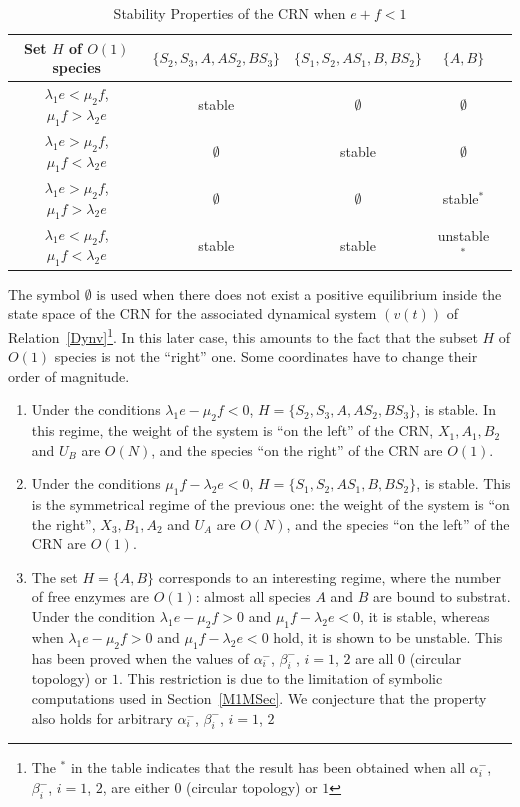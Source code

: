 \documentclass[english]{amsart}
\numberwithin{proposition}{section}
\begin{document}
 \begin{table}[h]
\begin{tabular}{|c|c|c|c|c|}
  \hline Set $H$ of $O(1)$ species   &$\{{ S}_2,{ S}_3, { A},  { AS}_2, { BS}_3\}$&$\{  { S}_1, { S}_2,  { AS}_1,{ B},  { BS}_2\}$&$\{   { A}, { B}\}$\\
  \hline $\lambda_1e<\mu_2f$, $\mu_1f>\lambda_2e$& stable & $\emptyset$ & $\emptyset$ \\
  \hline $\lambda_1e>\mu_2f$, $\mu_1f<\lambda_2e$&$\emptyset$&stable & $\emptyset$ \\
  \hline $\lambda_1e>\mu_2f$, $\mu_1f>\lambda_2e$& $\emptyset$ &$\emptyset$& stable${}^*$\\
  \hline $\lambda_1e<\mu_2f$, $\mu_1f<\lambda_2e$&stable&stable &unstable${}^*$ \\
  \hline
\end{tabular}
\vspace{4mm}

\caption{Stability Properties of the CRN when $e{+}f{<}1$}\label{Tab1}
 \end{table}

 The symbol $\emptyset$ is used when there does not exist a positive equilibrium inside the state space of the CRN for the  associated dynamical system $(v(t))$ of Relation~\eqref{Dynv}\footnote{The ${}^*$ in the table indicates that the result has been obtained when  all $\alpha_{i}^-$, $\beta_{i}^{-}$, $i{=}1$, $2$, are either $0$ (circular topology) or $1$}. In this later case, this amounts to the fact that the subset $H$ of $O(1)$ species is not the ``right'' one. Some coordinates have to change their order of magnitude. 

\begin{enumerate}
 \item Under the conditions $\lambda_1e{-}\mu_2f{<}0$, $H{=}\{{ S}_2,{ S}_3, { A},  { AS}_2, { BS}_3\}$, is stable.  In this regime, the weight of the system is ``on the left'' of the CRN, $X_1, A_1, B_2$ and $U_B$ are $O(N)$, and the species ``on the right'' of the CRN are $O(1)$.
  \item Under the conditions $\mu_1 f{-}\lambda_2e{<}0$, $H{=}\{  { S}_1, { S}_2,  { AS}_1,{ B},  { BS}_2\}$, is stable.  This is the symmetrical regime of the previous one: the weight of the system is ``on the right'', $X_3, B_1, A_2$ and $U_A$ are $O(N)$, and the species ``on the left'' of the CRN are $O(1)$.
	\item The set $H{=}\{ { A}, { B}\}$ corresponds to an interesting regime, where the number of free enzymes are $O(1)$: almost all species ${ A}$ and ${ B}$ are bound to substrat. Under the condition $\lambda_1e{-}\mu_2f{>}0$ and $\mu_1 f{-}\lambda_2e{<}0$, it is stable, whereas when $\lambda_1e{-}\mu_2f{>}0$ and $\mu_1 f{-}\lambda_2e{<}0$ hold, it is shown to be  unstable. This has been proved when the values of $\alpha_{i}^-$, $\beta_{i}^{-}$, $i{=}1$, $2$ are all  $0$ (circular topology) or $1$. This restriction is due to the limitation of symbolic computations used in Section~\ref{M1MSec}. We conjecture that the property also holds for arbitrary  $\alpha_{i}^-$, $\beta_{i}^{-}$, $i{=}1$, $2$
 \end{enumerate}
\end{document}
